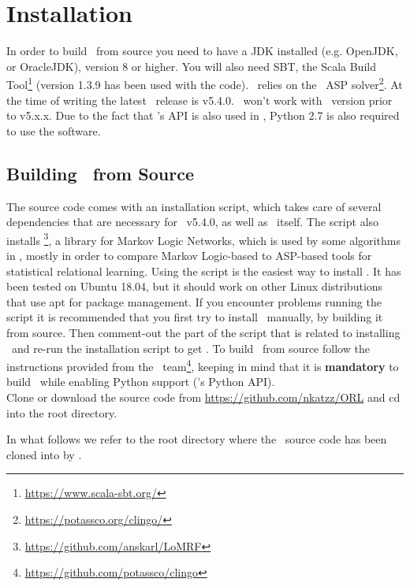 \section{Installation}
\label{sec:install}
In order to build \trail \ from source you need to have a JDK installed (e.g. OpenJDK, or OracleJDK), version 8 or higher. You will also need SBT, the Scala Build Tool\footnote{\url{https://www.scala-sbt.org/}} (version 1.3.9 has been used with the code). \trail \ relies on the \clingo \ ASP solver\footnote{\url{https://potassco.org/clingo/}}. At the time of writing the latest \clingo \ release is v5.4.0. \trail \ won't work with \clingo \ version prior to v5.x.x. Due to the fact that \clingo's API is also used in \trail, Python 2.7 is also required to use the software.  

\subsection{Building \trail \ from Source}

The source code comes with an installation script, which takes care of several dependencies that are necessary for \clingo \ v5.4.0, as well as \clingo \ itself. The script also installs \lomrf\footnote{\url{https://github.com/anskarl/LoMRF}}, a library for Markov Logic Networks, which is used by some algorithms in \trail, mostly in order to compare Markov Logic-based to ASP-based tools for statistical relational learning. Using the script is the easiest way to install \trail. It has been tested on Ubuntu 18.04, but it should work on other Linux distributions that use apt for package management. If you encounter problems running the script it is recommended that you first try to install \clingo \ manually, by building it from source. Then comment-out the part of the script that is related to installing \clingo \ and re-run the installation script to get \lomrf. To build \clingo \ from source follow the instructions provided from the \clingo \ team\footnote{\url{https://github.com/potassco/clingo}}, keeping in mind that it is \textbf{mandatory} to build \clingo \ while enabling Python support (\clingo's Python API). \\

\noindent Clone or download the source code from \url{https://github.com/nkatzz/ORL} and cd into the root directory. 

\begin{remark}
	In what follows we refer to the root directory where the \trail \ source code has been cloned into by \textbf{\code{\trailhome}}.
\end{remark}

